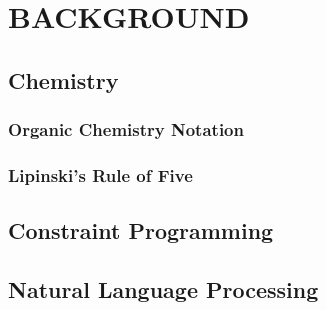 \documentclass[../Document.tex]{subfiles}
\begin{document}
\chapter{BACKGROUND}
\label{chap:background}

\section{Chemistry}
\label{sec:back/chemistry}



\subsection{Organic Chemistry Notation}



\subsection{Lipinski's Rule of Five}



\section{Constraint Programming}
\label{sec:back/cp}



\section{Natural Language Processing}
\label{sec:back/nlp}
\end{document}
